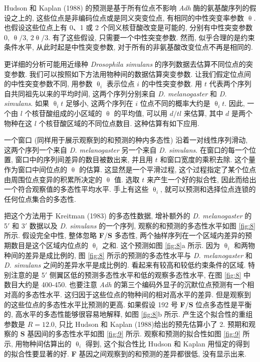 \documentclass[12pt]{article}
\begin{document}
Hudson 和 Kaplan (1988) 的预测是基于所有位点不影响 \textit{Adh} 酶的氨基酸序列的假设之上的,
这些位点是非编码位点或是同义突变位点, 有相同的中性突变率参数 $\uptheta$. 也假设这些位点上有 0、1 或 2
个同义核苷酸改变是可能的, 分别有中性突变参数 0, $\uptheta /3$, $2 \uptheta /3$. 有了这些假设, 只需要一个中性突变参数. 然而,
似乎合理的是约束条件水平, 从此时起是中性突变参数, 对于所有的非氨基酸改变位点不再是相同的.

更详细的分析可能用近缘种 \textit{Drosophila simulans} 的序列数据去估算不同位点的突变参数.
我们可以按照如下方法用物种间的数据估算突变参数. 让我们假定位点间的中性突变参数不同, 用参数 $\uptheta_{i}$ 表示位点 $i$
的中性突变参数. 用 $t$ 代表两个序列自共同祖先以来的平均时间, 这两个序列分别来自 \textit{D. melanogaster} 和
\textit{D. simulans}. 如果 $\uptheta_{i}t$ 足够小, 这两个序列在 $i$ 位点不同的概率大约是 $\uptheta_{i}t$. 因此,
一个由 $l$ 个核苷酸组成的小区域的 $\uptheta$ 的平均值, 可以用 $d/tl$ 来估算, 其中 $d$ 是两个物种在这 $l$
个核苷酸区域的不同位点数目. 这种估算有如下应用.

一个窗口 (同样用于展示观察到的和预测的种内多态性) 沿着一对线性序列滑动, 这两个序列一个来自 \textit{D. melanogaster}
另一个来自 \textit{D. simulans}. 在窗口的每一个位置, 窗口中的序列间差异的数目被数出来, 并且用 $t$
和窗口宽度的乘积去除. 这个量作为窗口中间位点的 $\uptheta$ 的估算. 这显然是一个平滑过程,
这个过程指定了某个位点由周围位点变异的积累所决定的 $\uptheta$ 值. 选取 $t$ 来产生一个好的拟合性,
因此而给出一个符合观察值的多态性平均水平. 手上有这些 $\uptheta_{i}$, 就可以预测和选择位点连锁的任何位点集合的多态性.

把这个方法用于 Kreitman (1983) 的多态性数据, 增补额外的 \textit{D. melanogaster} 的 5${\prime}$ 和
3${\prime}$ 数据以及 \textit{D. simulans} 的一个序列, 观察的和预测的多态性水平如图 \ref{fig:8} 所示. 假设完全中性,
整体忽略 \textbf{F}/\textbf{S} 多态性, 两个抽样序列在一个区域内差异的预期数目是这个区域内位点的 $\uptheta _{i}$ 之和.
这个预测如图 \ref{fig:8}a 所示. 因为 $\uptheta _{i}$ 和两物种间的差异是成比例的, 图 \ref{fig:8} 所示的预测的多态性水平与 \textit{D.
    melanogaster} 和 \textit{D. simulans} 之间的差异水平是成比例的. 看起来有较高和较低约束条件的区域. 特别注意的是
5${\prime}$ 侧翼区低的预测多态性水平和低的观察多态性水平, 在图 \ref{fig:8} 中数目大约是 400-450.
也要注意 \textit{Adh} 的第三个编码外显子的沉默位点预测有一个相对高的多态性水平. 这归因于这些位点的物种间的相对高水平的差异.
但是观察到的这些位点的多态性水平比预测的更高. 如果假设 192 号 \textbf{F}/\textbf{S} 位点多态性是平衡的,
高水平的多态性能够很容易地解释, 如图 \ref{fig:8}b 所示. 产生这个拟合性的重组参数是 $R=12.0$, 只比 Hudson 和
Kaplan (1988)给出的预先估算小了 2. 预期和观察的 \textbf{S} 基因间的多态性水平如图 \ref{fig:9} 所示. 观察和预测的拟合性如图 \ref{fig:9}
所示, 用物种间估算出的 $\uptheta _{i}$ 得到, 这个拟合性比 Hudson 和 Kaplan 用恒定的得到的拟合性要显著的好.
\textbf{F} 基因之间观察到的和预测的差异都很低, 没有显示出来.
\end{document}
